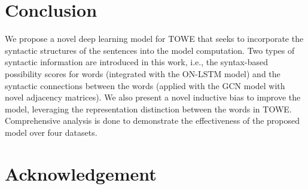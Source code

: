 \documentclass[11pt,a4paper]{article}
\begin{document}
\begin{comment}
\begin{table*}[t!]
    \centering
    \begin{tabular}{ m{10cm}}
        \hline
       The \textbf{mouse} is a little bit different than what you're used to though- it has one big flat panel and one full bar (instead of two separate ones) to click with- but you get used to it \textbf{quite} quickly. \\ \hline
       We have had numerous \textbf{problems} with Vista, such as Adobe Flash player just quits and has to be uninstalled and then reinstalled, Internet Explore just quits and you lose whatever you were working on, also, the same \textbf{Windows update} has appeared on this computer since we got it and has been updated probably 400 times, the same update. \\ \hline
       Its pretty \textbf{fast} and does not have hiccups while I am using it for web browsing, uploading photos, watching movies (720p) on occasion and \textbf{creating presentations}. \\ \hline
    \end{tabular}
    \caption{The GCN-failure examples. The two entity mentions of interest are shown in bold in the sentences.}
    \label{tab:example}
\end{table*}

\end{comment}

\section{Conclusion}

We propose a novel deep learning model for TOWE that seeks to incorporate the syntactic structures of the sentences into the model computation. Two types of syntactic information are introduced in this work, i.e., the syntax-based possibility scores for words (integrated with the ON-LSTM model) and the syntactic connections between the words (applied with the GCN model with novel adjacency matrices). We also present a novel inductive bias to improve the model, leveraging the representation distinction between the words in TOWE. Comprehensive analysis is done to demonstrate the effectiveness of the proposed model over four datasets.





\section*{Acknowledgement}
\end{document}
